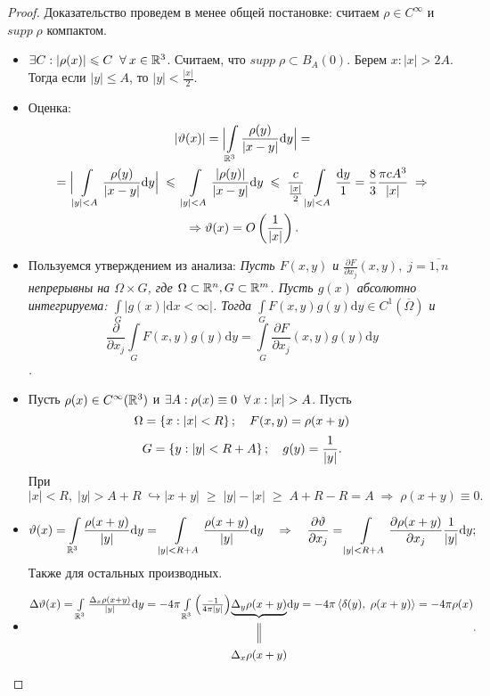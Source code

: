 \begin{proof}

Доказательство проведем в менее общей постановке: считаем $\rho \in C^\infty$ и $supp \;\rho$ компактом.

	\begin{itemize}
		\item $\exists C: |\rho (x)|\leqslant C \;\;\forall\:  x \in \mathbb{R}^3$. Считаем, что $supp \;\rho  \subset B_A(0)$. Берем $x: |x| > 2A$. Тогда если $|y| \leq A$, то $|y| < \frac{|x|}{2}$.
        \item Оценка:
        	\begin{multline*}
				\ |\vartheta (x)| = \Bigl | \int\limits_{\mathbb{R}^3} \frac{\rho (y)}{|x-y|}\mathrm{d}y \Bigr | = {}\\
                {} = \Bigl | \int\limits_{|y|<A} \frac{\rho (y)}{|x-y|}\mathrm{d}y \Bigr | \;\leqslant\; \int\limits_{|y|<A} \frac{|\rho (y)|}{|x-y|}\mathrm{d}y \;\leqslant\; \frac{c}{\frac{|x|}{2}}\int\limits_{|y|<A}\frac{\mathrm{d}y}{1} = \frac{8}{3}\frac{\pi c A^3}{|x|} \;\Rightarrow {}\\
                {} \Rightarrow \vartheta (x) = O \left(\frac{1}{|x|}\right).
			\end{multline*}
        \item Пользуемся утверждением из анализа: {\it Пусть $F(x,y)$ и $\frac{\partial F}{\partial x_j}(x,y), \; j= \overline{1,n}$ непрерывны на $\Omega \times G$, где $\Omega \subset  \mathbb{R}^n, G \subset \mathbb{R}^m$. Пусть $g(x)$ абсолютно интегрируема: $\int\limits_G |g(x)| \mathrm{d}x < \infty|$. Тогда $\int\limits_G F(x,y)g(y) \mathrm{d}y \in C^1(\overline{\Omega})$ и
        $$
        \frac{\partial}{\partial x_j}\int\limits_G F(x,y)g(y)\mathrm{d}y = \int\limits_G \frac{\partial F}{\partial x_j}(x,y)g(y)\mathrm{d}y 
        $$.}
        \item Пусть $\rho (x) \in C^\infty (\mathbb{R}^3)$ и $\exists A: \rho (x) \equiv 0 \;\;\forall\: x: |x| > A$. Пусть 
        $$\Omega = \left\{x: |x| < R\right\};\quad F(x,y) = \rho (x+y)$$
        $$G = \left\{y: |y| < R+A\right\};\quad g(y) = \frac{1}{|y|}.$$
        При $|x| < R,\; |y| > A+R \; \hookrightarrow |x+y| \;\geq\; |y| - |x| \;\geq\; A+R -R = A \;\Rightarrow \; \rho (x+y) \equiv 0. $
        \item 
        $$
        \vartheta (x) = \int\limits_{\mathbb{R}^3}\frac{\rho (x+y)}{|y|}\mathrm{d} y = \int\limits_{|y| < R+A}\frac{\rho (x+y)}{|y|}\mathrm{d} y \quad \Rightarrow\quad \frac{\partial \vartheta}{\partial x_j} = \int\limits_{|y| < R+A}\frac{\partial \rho (x+y)}{\partial x_j}\frac{1}{|y|}\mathrm{d} y
        ;$$ Также для остальных производных.
        \item 
        $$
        \begin{CD}
          \Delta \vartheta (x) = \int\limits_{\R^3}\frac{\Delta_x \rho (x+y)}{|y|}\mathrm{d}y = -4\pi \int\limits_{\R^3}\brs{\frac{-1}{4\pi |y|}} @. \underbrace{\Delta_y \rho (x+y)} @.\mathrm{d}y = -4\pi \rbrs{\delta(y),\; \rho (x+y)} = -4\pi \rho (x) \\
          @.   @|   @.\\
          @.   {\Delta_x \rho (x+y)}   @.
        \end{CD}
        .$$
	\end{itemize}

\end{proof}